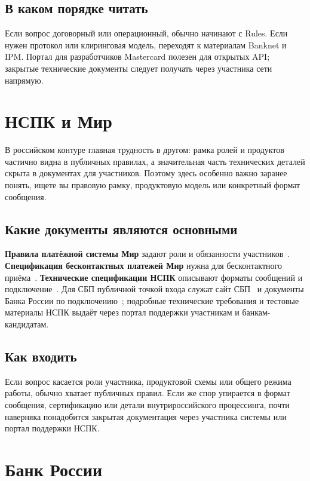 \subsection*{В каком порядке читать}

Если вопрос договорный или операционный, обычно начинают
с Rules. Если нужен протокол или клиринговая модель, переходят
к материалам Banknet и IPM. Портал для разработчиков Mastercard
полезен для открытых API; закрытые технические документы
следует получать через участника сети напрямую.

\section{НСПК и Мир}
\label{sec:ps-nspk}

В российском контуре главная трудность в другом: рамка ролей
и продуктов частично видна в публичных правилах, а значительная
часть технических деталей скрыта в документах для участников.
Поэтому здесь особенно важно заранее понять, ищете вы правовую
рамку, продуктовую модель или конкретный формат сообщения.

\subsection*{Какие документы являются основными}

\textbf{Правила платёжной системы Мир} задают роли и обязанности
участников~\cite{nspk-mir-rules}. \textbf{Спецификация бесконтактных
платежей Мир}
нужна для бесконтактного приёма~\cite{nspk-mir-contactless}.
\textbf{Технические спецификации
НСПК} описывают форматы сообщений и подключение~\cite{nspk-tsp}. Для
СБП публичной
точкой входа служат сайт СБП~\cite{sbp-main} и документы Банка России
по подключению~\cite{cbr-sbp-actions};
подробные технические требования и тестовые материалы НСПК выдаёт
через портал поддержки участникам и банкам-кандидатам.

\subsection*{Как входить}

Если вопрос касается роли участника, продуктовой схемы или общего
режима работы, обычно хватает публичных правил. Если же спор
упирается в формат сообщения, сертификацию или детали
внутрироссийского процессинга, почти наверняка понадобится
закрытая документация через участника системы или портал поддержки
НСПК.

\section{Банк России}
\label{sec:ps-cbr}

